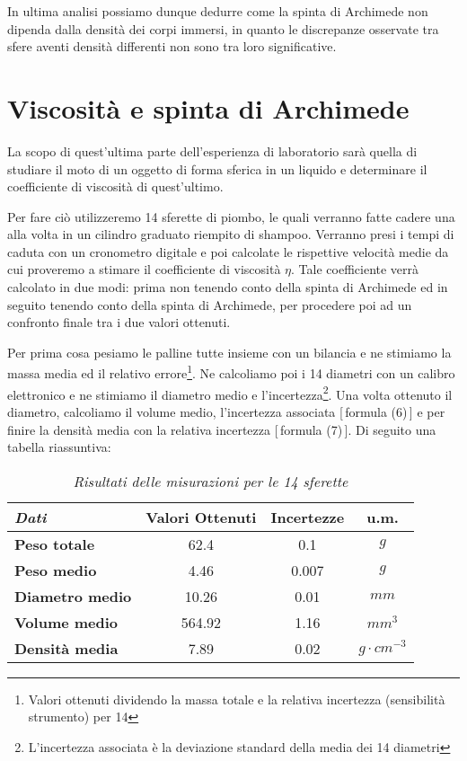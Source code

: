 \documentclass{article}
\begin{document}
In ultima analisi possiamo dunque dedurre come la spinta di Archimede non dipenda dalla densità dei corpi immersi, in quanto le discrepanze osservate tra sfere aventi densità differenti non sono tra loro significative.

\section{Viscosità e spinta di Archimede}
La scopo di quest'ultima parte dell'esperienza di laboratorio sarà quella di studiare il moto di un oggetto di forma sferica in un liquido e determinare il coefficiente di viscosità di quest'ultimo.

Per fare ciò utilizzeremo 14 sferette di piombo, le quali verranno fatte cadere una alla volta in un cilindro graduato riempito di shampoo. Verranno presi i tempi di caduta con un cronometro digitale e poi calcolate le rispettive velocità medie da cui proveremo a stimare il coefficiente di viscosità $\eta$. Tale coefficiente verrà calcolato in due modi: prima non tenendo conto della spinta di Archimede ed in seguito tenendo conto della spinta di Archimede, per procedere poi ad un confronto finale tra i due valori ottenuti.\medskip

Per prima cosa pesiamo le palline tutte insieme con un bilancia e ne stimiamo la massa media ed il relativo errore\footnote{Valori ottenuti dividendo la massa totale e la relativa incertezza (sensibilità strumento) per 14}. Ne calcoliamo poi i 14 diametri con un calibro elettronico e ne stimiamo il diametro medio e l'incertezza\footnote{L'incertezza associata è la deviazione standard della media dei 14 diametri}. Una volta ottenuto il diametro, calcoliamo il volume medio, l'incertezza associata [\,formula (6)\,] e per finire la densità media con la relativa incertezza [\,formula (7)\,].
Di seguito una tabella riassuntiva: 

\begin{table}[H]
    \centering
    \renewcommand{\arraystretch}{1.2} %
    \begin{tabular}{|l|c|c|c|}
        \hline
        \textit{Dati} & \textbf{Valori Ottenuti} & \textbf{Incertezze} & \textbf{u.m.}  \\
        \hline
        \textbf{Peso totale} & 62.4 & 0.1 & $g$ \\
        \hline
        \textbf{Peso medio} & 4.46 & 0.007 & $g$\\
        \hline
        \textbf{Diametro medio} & 10.26 & 0.01 & $mm$\\
        \hline
        \textbf{Volume medio} & 564.92 & 1.16 & $mm^3$\\
        \hline
        \textbf{Densità media} & 7.89 & 0.02 & $g\cdot cm^{-3}$\\
        \hline
    \end{tabular}
    \caption{\textit{Risultati delle misurazioni per le 14 sferette}}
\end{table}
\end{document}
